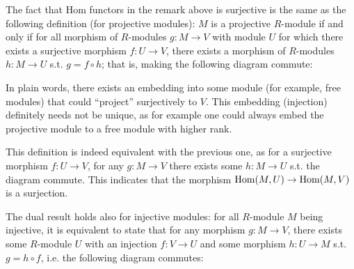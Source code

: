 \documentclass{article}
\begin{document}
\begin{remark}\label{rmk:Alt def for projective module}
    The fact that Hom functors in the remark above is surjective is the same as the following definition (for projective modules): $M$ is a projective $R$-module if and only if for all morphism of $R$-modules $g: M \to V$ with module $U$ for which there exists a surjective morphism $f: U \to V$, there exists a morphism of $R$-modules $h: M \to U$ s.t. $g = f \circ h$; that is, making the following diagram commute:
    \begin{figure}[htbp]
        \centering
    \end{figure}

    In plain words, there exists an embedding into some module (for example, free modules) that could ``project'' surjectively to $V$. This embedding (injection) definitely needs not be unique, as for example one could always embed the projective module to a free module with higher rank. 
    
    This definition is indeed equivalent with the previous one, as for a surjective morphism $f: U \to V$, for any $g: M \to V$ there exists some $h: M \to U$ s.t. the diagram commute. This indicates that the morphism $\mathrm{Hom}(M, U) \to \mathrm{Hom}(M, V)$ is a surjection.
    
    The dual result holds also for injective modules: for all $R$-module $M$ being injective, it is equivalent to state that for any morphism $g: M \to V$, there exists some $R$-module $U$ with an injection $f: V \to U$ and some morphism $h: U \to M$ s.t. $g = h \circ f$, i.e. the following diagram commutes:
    \begin{figure}[htbp]
        \centering
    \end{figure}
\end{remark}
\end{document}
